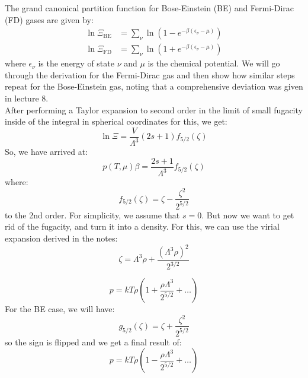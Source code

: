 \documentclass[12pt]{article}
\begin{document}
The grand canonical partition function for Bose-Einstein (BE) and Fermi-Dirac (FD) gases are given by:
\begin{align}
    \ln \Xi_{\text{BE}} &= \sum_{\nu} \ln \left(1 - e^{-\beta(\epsilon_{\nu} - \mu)}\right) \\
    \ln \Xi_{\text{FD}} &= \sum_{\nu} \ln \left(1 + e^{-\beta(\epsilon_{\nu} - \mu)}\right)
\end{align}
where $\epsilon_{\nu}$ is the energy of state $\nu$ and $\mu$ is the chemical potential.
We will go through the derivation for the Fermi-Dirac gas and then show how similar steps repeat for the Bose-Einstein gas, noting that a comprehensive deviation was given in lecture 8.\\
After performing a Taylor expansion to second order in the limit of small fugacity inside of the integral in spherical coordinates for this, we get:
\begin{equation}
\ln \Xi=\frac{V}{\Lambda^3}(2 s+1) f_{5 / 2}(\zeta)
\end{equation}
So, we have arrived at:
\begin{equation}
    p(T, \mu)\beta = \frac{2s+1}{\Lambda^3}f_{5/2}(\zeta)
\end{equation}
where:
\begin{equation}
f_{5 / 2}(\zeta)=\zeta-\frac{\zeta^2}{2^{5 / 2}}
\end{equation}
to the 2nd order.
For simplicity, we assume that $s=0$.
But now we want to get rid of the fugacity, and turn it into a density. For this, we can use the virial expansion derived in the notes:
\begin{equation}
\zeta=\Lambda^3 \rho+\frac{\left(\Lambda^3 \rho\right)^2}{2^{3 / 2}}
\end{equation}

\begin{equation}
    p = kT\rho\left(1 + \frac{\rho\Lambda^{3}}{2^{5/2}} + \ldots\right)
\end{equation}
For the BE case, we will have:
\begin{equation}
  g_{5 / 2}(\zeta)=\zeta+\frac{\zeta^2}{2^{5 / 2}}
\end{equation}
so the sign is flipped and we get a final result of:
\begin{equation}
    p = kT\rho\left(1 - \frac{\rho\Lambda^{3}}{2^{5/2}} + \ldots\right)
\end{equation}

\end{document}
